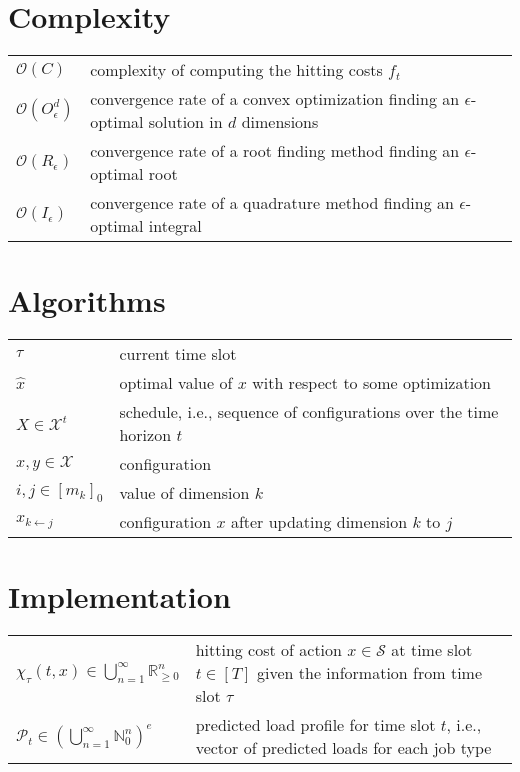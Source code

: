 \section*{Complexity}

\begin{tabularx}{\textwidth}{p{100pt}X}
    $\mathcal{O}(C)$ & complexity of computing the hitting costs $f_t$ \\
    $\mathcal{O}(O_{\epsilon}^d)$ & convergence rate of a convex optimization finding an $\epsilon$-optimal solution in $d$ dimensions \\
    $\mathcal{O}(R_{\epsilon})$ & convergence rate of a root finding method finding an $\epsilon$-optimal root \\
    $\mathcal{O}(I_{\epsilon})$ & convergence rate of a quadrature method finding an $\epsilon$-optimal integral \\
\end{tabularx}

\section*{Algorithms}

\begin{tabularx}{\textwidth}{p{100pt}X}
    $\tau$ & current time slot \\
    $\hat{x}$ & optimal value of $x$ with respect to some optimization \\
    $X \in \mathcal{X}^t$ & schedule, i.e., sequence of configurations over the time horizon $t$ \\
    $x, y \in \mathcal{X}$ & configuration \\
    $i, j \in [m_k]_0$ & value of dimension $k$ \\
    $x_{k \gets j}$ & configuration $x$ after updating dimension $k$ to $j$ \\
\end{tabularx}

\section*{Implementation}

\begin{tabularx}{\textwidth}{p{100pt}X}
    $\chi_{\tau}(t, x) \in \bigcup_{n=1}^{\infty} \mathbb{R}_{\geq 0}^n$ & hitting cost of action $x \in \mathcal{S}$ at time slot $t \in [T]$ given the information from time slot $\tau$ \\
    $\mathcal{P}_t \in \left(\bigcup_{n=1}^{\infty} \mathbb{N}_0^n\right)^e$ & predicted load profile for time slot $t$, i.e., vector of predicted loads for each job type\\
\end{tabularx}

